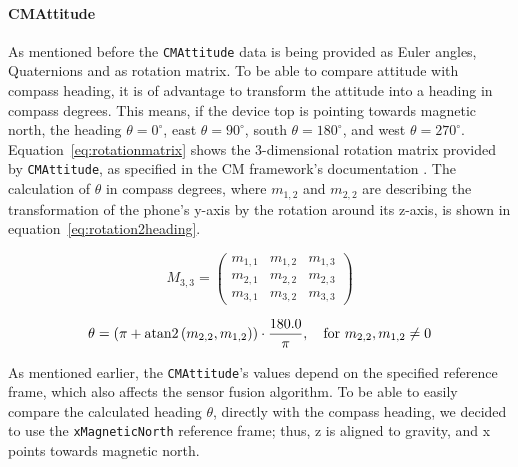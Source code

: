 \paragraph{CMAttitude} As mentioned before the \texttt{CMAttitude} data is being provided as Euler angles, Quaternions and as rotation matrix. To be able to compare attitude with compass heading, it is of advantage to transform the attitude into a heading in compass degrees. This means, if the device top is pointing towards magnetic north, the heading $\theta = 0^{\circ}$, east $\theta = 90^{\circ}$, south $\theta = 180^{\circ}$, and west $\theta = 270^{\circ}$. Equation~\ref{eq:rotationmatrix} shows the 3-dimensional rotation matrix provided by \texttt{CMAttitude}, as specified in the \ac{CM} framework's documentation \citep{apple:ios_doc_cm}. The calculation of $\theta$ in compass degrees, where $m_{1,2}$ and $m_{2,2}$ are describing the transformation of the phone's y-axis by the rotation around its z-axis, is shown in equation~\ref{eq:rotation2heading}.

\begin{equation} \label{eq:rotationmatrix}
  M_{3,3} = \begin{pmatrix}
      m_{1,1} & m_{1,2} & m_{1,3} \\
      m_{2,1} & m_{2,2} & m_{2,3} \\
      m_{3,1} & m_{3,2} & m_{3,3}
  \end{pmatrix}
\end{equation}

\begin{equation} \label{eq:rotation2heading}
  \theta = (\pi + {\rm atan2}\left(m_{2,2} , m_{1,2}\right)) \cdot \frac{180.0}{\pi}, \quad \text{for } m_{2,2}, m_{1,2} \neq 0
\end{equation}

As mentioned earlier, the \texttt{CMAttitude}'s values depend on the specified reference frame, which also affects the sensor fusion algorithm. To be able to easily compare the calculated heading $\theta$, directly with the compass heading, we decided to use the \texttt{xMagneticNorth} reference frame; thus, z is aligned to gravity, and x points towards magnetic north.

